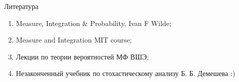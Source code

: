 \documentclass{beamer}%
\theoremstyle{definition}
\begin{document}
 










\begin{frame}{Литература}


\begin{enumerate}
    \item Measure, Integration \& Probability, Ivan F Wilde;
    \item Measure and Integration MIT course;
    \item Лекции по теории вероятностей МФ ВШЭ;
    \item Незаконченный учебник по стохастическому анализу Б. Б. Демешева :)
\end{enumerate}


\end{frame}
\end{document}
